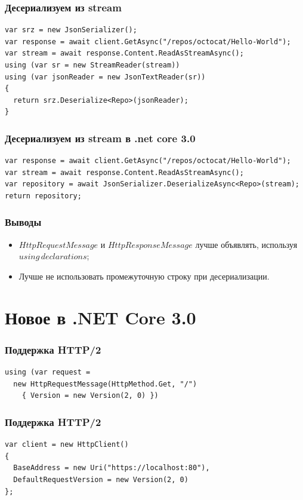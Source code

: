 \documentclass[17pt,aspectratio=169]{beamer}
\begin{document}
\begin{frame}[fragile]
\frametitle{Десериализуем из stream}
\begin{lstlisting}
var srz = new JsonSerializer();
var response = await client.GetAsync("/repos/octocat/Hello-World");
var stream = await response.Content.ReadAsStreamAsync();
using (var sr = new StreamReader(stream))
using (var jsonReader = new JsonTextReader(sr))
{
  return srz.Deserialize<Repo>(jsonReader);
}
\end{lstlisting}
\end{frame}

\begin{frame}[fragile]
\frametitle{Десериализуем из stream в .net core 3.0}
\begin{lstlisting}
var response = await client.GetAsync("/repos/octocat/Hello-World");
var stream = await response.Content.ReadAsStreamAsync();
var repository = await JsonSerializer.DeserializeAsync<Repo>(stream);
return repository;
\end{lstlisting}
\end{frame}

\begin{frame}
\frametitle{Выводы}
\begin{itemize}
	\item <1-> $HttpRequestMessage$ и $HttpResponseMessage$ лучше объявлять, используя $using\,declarations$;
	\item <2-> Лучше не использовать промежуточную строку при десериализации.
\end{itemize}
\end{frame}

\section{Новое в .NET Core 3.0}
\begin{frame}[fragile]
\frametitle{Поддержка HTTP/2}
\begin{lstlisting}
using (var request = 
  new HttpRequestMessage(HttpMethod.Get, "/") 
    { Version = new Version(2, 0) })
\end{lstlisting}
\end{frame}

\begin{frame}[fragile]
\frametitle{Поддержка HTTP/2}
\begin{lstlisting}
var client = new HttpClient()
{
  BaseAddress = new Uri("https://localhost:80"),
  DefaultRequestVersion = new Version(2, 0)
};
\end{lstlisting}
\end{frame}
\end{document}
